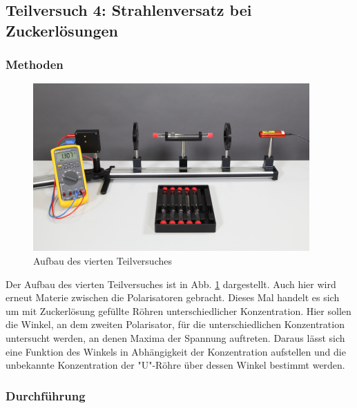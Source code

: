 \subsection{Teilversuch 4: Strahlenversatz bei Zuckerlösungen}

	\subsubsection*{Methoden}
		
		\begin{figure}[ht]
			\centering
			\includegraphics[width=\textwidth]{bilder/Zucker.png}
			\caption{Aufbau des vierten Teilversuches\cite{WWU}}
			\label{fig:Zucker}	
		\end{figure}
		Der Aufbau des vierten Teilversuches ist in Abb. \ref{fig:Zucker} dargestellt.
		Auch hier wird erneut Materie zwischen die Polarisatoren gebracht.
		Dieses Mal handelt es sich um mit Zuckerlösung gefüllte Röhren unterschiedlicher Konzentration.
		Hier sollen die Winkel, an dem zweiten Polarisator, für die unterschiedlichen Konzentration untersucht werden, an denen Maxima der Spannung auftreten.
		Daraus lässt sich eine Funktion des Winkels in Abhängigkeit der Konzentration aufstellen und die unbekannte Konzentration der "U"-Röhre über dessen Winkel bestimmt werden.
		
	\subsubsection*{Durchführung}
		
